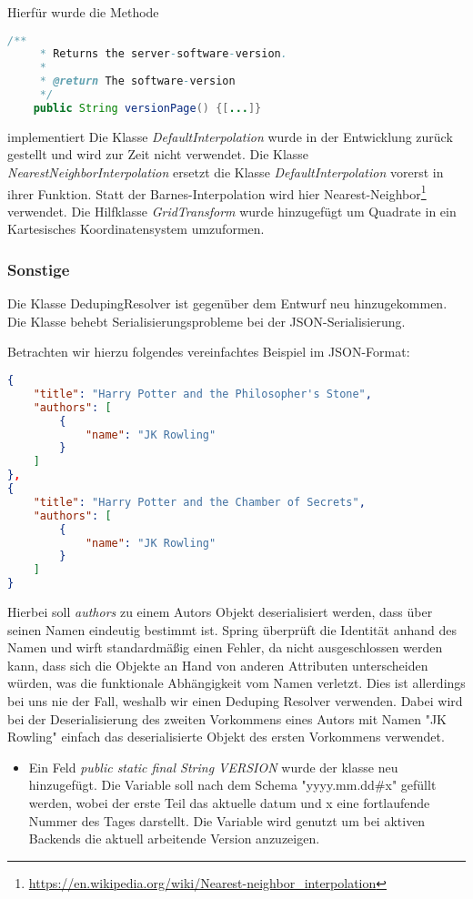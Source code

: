 Hierfür wurde die Methode
\begin{lstlisting}[language=java]
    /**
     * Returns the server-software-version.
     * 
     * @return The software-version
     */
    public String versionPage() {[...]}
\end{lstlisting}
implementiert
Die Klasse \textit{DefaultInterpolation} wurde in der Entwicklung zurück gestellt und wird zur Zeit nicht verwendet.
\noChange
{}
Die Klasse \textit{NearestNeighborInterpolation} ersetzt die Klasse \textit{DefaultInterpolation} vorerst in ihrer Funktion.
Statt der Barnes-Interpolation wird hier Nearest-Neighbor\footnote{\url{https://en.wikipedia.org/wiki/Nearest-neighbor_interpolation}} verwendet.
Die Hilfklasse \textit{GridTransform} wurde hinzugefügt um Quadrate in ein Kartesisches Koordinatensystem umzuformen.



\subsubsection{Sonstige}
Die Klasse DedupingResolver ist gegenüber dem Entwurf neu hinzugekommen.
\\
Die Klasse behebt Serialisierungsprobleme bei der \gls{JSON}-Serialisierung.

Betrachten wir hierzu folgendes vereinfachtes Beispiel im \gls{JSON}-Format:
\begin{lstlisting}[frame=single, language=json]
{
    "title": "Harry Potter and the Philosopher's Stone",
    "authors": [
        {
            "name": "JK Rowling"
        }
    ]
},
{
    "title": "Harry Potter and the Chamber of Secrets",
    "authors": [
        {
            "name": "JK Rowling"
        }
    ]
}
\end{lstlisting}
Hierbei soll \textit{authors} zu einem Autors Objekt deserialisiert werden, dass über seinen Namen eindeutig bestimmt ist.
Spring überprüft die Identität anhand des Namen und wirft standardmäßig einen Fehler, da nicht ausgeschlossen werden kann, dass sich die Objekte an Hand von anderen Attributen unterscheiden würden, was die funktionale Abhängigkeit vom Namen verletzt.
Dies ist allerdings bei uns nie der Fall, weshalb wir einen Deduping Resolver verwenden.
Dabei wird bei der Deserialisierung des zweiten Vorkommens eines Autors mit Namen "JK Rowling" einfach das deserialisierte Objekt des ersten Vorkommens verwendet.
\noChange
{}
\begin{itemize}[noitemsep]
    \item Ein Feld \textit{public static final String VERSION} wurde der klasse neu hinzugefügt. Die Variable soll nach dem Schema "yyyy.mm.dd\#x" gefüllt werden, wobei der erste Teil das aktuelle datum und x eine fortlaufende Nummer des Tages darstellt. Die Variable wird genutzt um bei aktiven Backends die aktuell arbeitende Version anzuzeigen.
\end{itemize}